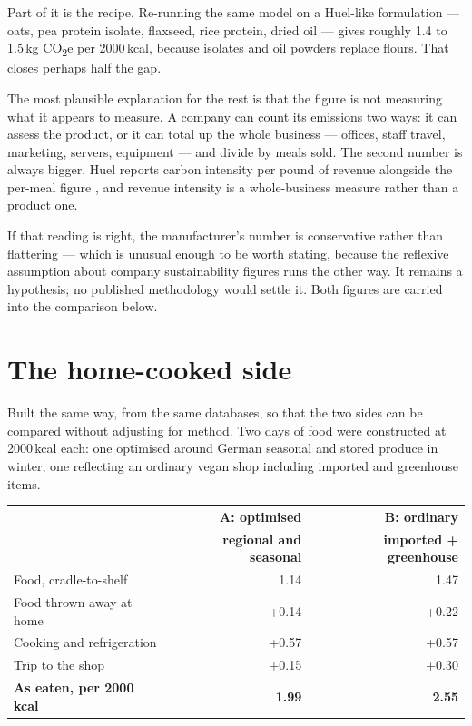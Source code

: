 \documentclass[11pt,a4paper]{article}
\newcommand{\co}{CO\textsubscript{2}e}
\begin{document}
Part of it is the recipe. Re-running the same model on a Huel-like formulation — oats,
pea protein isolate, flaxseed, rice protein, dried oil — gives roughly 1.4 to 1.5\,kg
\co{} per 2000\,kcal, because isolates and oil powders replace flours. That closes
perhaps half the gap.

The most plausible explanation for the rest is that the figure is not measuring what
it appears to measure. A company can count its emissions two ways: it can assess the
product, or it can total up the whole business — offices, staff travel, marketing,
servers, equipment — and divide by meals sold. The second number is always bigger.
Huel reports carbon intensity per pound of revenue alongside the per-meal figure
\cite{huel-sustain}, and revenue intensity is a whole-business measure rather than a
product one.

If that reading is right, the manufacturer's number is conservative rather than
flattering — which is unusual enough to be worth stating, because the reflexive
assumption about company sustainability figures runs the other way. It remains a
hypothesis; no published methodology would settle it. Both figures are carried into
the comparison below.

\section{The home-cooked side}

Built the same way, from the same databases, so that the two sides can be compared
without adjusting for method. Two days of food were constructed at 2000\,kcal each:
one optimised around German seasonal and stored produce in winter, one reflecting an
ordinary vegan shop including imported and greenhouse items.

\begin{table}[h]
\centering
\footnotesize
\begin{tabular}{@{}lrr@{}}
\toprule
& \textbf{A: optimised} & \textbf{B: ordinary} \\
& \textbf{regional and seasonal} & \textbf{imported + greenhouse} \\
\midrule
Food, cradle-to-shelf & 1.14 & 1.47 \\
Food thrown away at home & +0.14 & +0.22 \\
Cooking and refrigeration & +0.57 & +0.57 \\
Trip to the shop & +0.15 & +0.30 \\
\midrule
\textbf{As eaten, per 2000\,kcal} & \textbf{1.99} & \textbf{2.55} \\
\bottomrule
\end{tabular}
\end{table}
\end{document}

